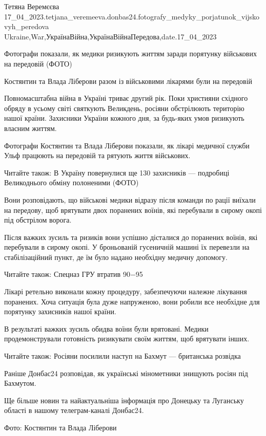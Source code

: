  
 
 
 
 

Тетяна Веремєєва
17_04_2023.tetjana_veremeeva.donbas24.fotografy_medyky_porjatunok_vijskovyh_peredova
Ukraine,War,УкраїнаВійна,УкраїнаВійнаПередова,date.17_04_2023

Фотографи показали, як медики ризикують життям заради порятунку військових на
передовій (ФОТО)

Костянтин та Влада Ліберови разом із військовими лікарями були на передовій

Повномасштабна війна в Україні триває другий рік. Поки християни східного
обряду в усьому світі святкують Великдень, росіяни обстрілюють територію нашої
країни. Захисники України кожного дня, за будь-яких умов ризикують власним
життям.

Фотографи Костянтин та Влада Ліберови показали, як лікарі медичної служби Ульф
працюють на передовій та рятують життя військових.

Читайте також: В Україну повернулися ще 130 захисників — подробиці Великоднього
обміну полоненими (ФОТО)

Вони розповідають, що військові медики відразу після команди по рації виїхали
на передову, щоб врятувати двох поранених воїнів, які перебували в сирому окопі
під обстрілом ворога.

Після важких зусиль та ризиків вони успішно дісталися до поранених воїнів, які
перебували в сирому окопі. У броньованій гусеничній машині їх перевезли на
стабілізаційний пункт, де їм було надано необхідну медичну допомогу.

Читайте також: Спецназ ГРУ втратив 90−95%

Лікарі ретельно виконали кожну процедуру, забезпечуючи належне лікування
поранених. Хоча ситуація була дуже напруженою, вони робили все необхідне для
порятунку захисників нашої країни.

В результаті важких зусиль обидва воїни були врятовані. Медики продемонстрували
готовність ризикувати своїм життям, щоб врятувати інших.

Читайте також: Росіяни посилили наступ на Бахмут — британська розвідка

Раніше Донбас24 розповідав, як українські мінометники знищують росіян під
Бахмутом.

Ще більше новин та найактуальніша інформація про Донецьку та Луганську області
в нашому телеграм-каналі Донбас24.

Фото: Костянтин та Влада Ліберови
